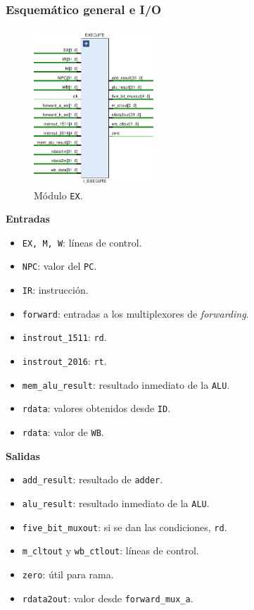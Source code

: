 \documentclass[a4paper]{article}
\begin{document}
\subsubsection{Esquemático general e I/O}

\begin{figure}[H]
	\begin{center}				
	\includegraphics[width=0.4\textwidth,center]{TP4_11.png}
  	\caption{Módulo \texttt{EX}.}
  	\label{fig:funcionamiento.}
  	\end{center}
\end{figure}


\textbf{Entradas}
\begin{itemize}
	\item \texttt{EX, M, W}: líneas de control.
	\item \texttt{NPC}: valor del \texttt{PC}.
	\item \texttt{IR}: instrucción.
	\item \texttt{forward}: entradas a los multiplexores de \textit{forwarding}.
	\item \texttt{instrout\_1511}: \texttt{rd}.
	\item \texttt{instrout\_2016}: \texttt{rt}.
	\item \texttt{mem\_alu\_result}: resultado inmediato de la \texttt{ALU}.
	\item \texttt{rdata}: valores obtenidos desde \texttt{ID}.
	\item \texttt{rdata}: valor de \texttt{WB}.
		
\end{itemize}

\textbf{Salidas}
\begin{itemize}
	\item \texttt{add\_result}: resultado de \texttt{adder}.
	\item \texttt{alu\_result}: resultado inmediato de la \texttt{ALU}.
	\item \texttt{five\_bit\_muxout}: si se dan las condiciones, \texttt{rd}.
	\item \texttt{m\_cltout} y \texttt{wb\_ctlout}: líneas de control.
	\item \texttt{zero}: útil para rama.
	\item \texttt{rdata2out}: valor desde \texttt{forward\_mux\_a}.
\end{itemize}
\end{document}
